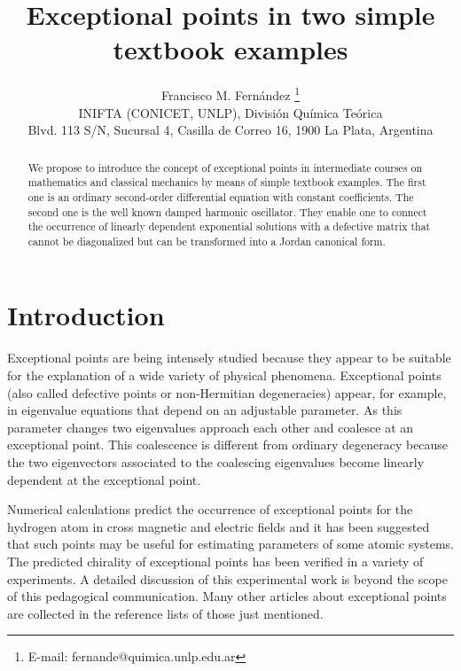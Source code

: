 \documentclass{article}
\begin{document}
\date{}
\title{Exceptional points in two simple textbook examples}
\author{Francisco M. Fern\'{a}ndez \thanks{%
E-mail: fernande@quimica.unlp.edu.ar} \\
INIFTA (CONICET, UNLP), Divisi\'on Qu\'imica Te\'orica\\
Blvd. 113 S/N, Sucursal 4, Casilla de Correo 16, 1900 La Plata, Argentina}
\maketitle

\begin{abstract}
We propose to introduce the concept of exceptional points in intermediate
courses on mathematics and classical mechanics by means of simple textbook
examples. The first one is an ordinary second-order differential equation
with constant coefficients. The second one is the well known damped harmonic
oscillator. They enable one to connect the occurrence of linearly dependent
exponential solutions with a defective matrix that cannot be diagonalized
but can be transformed into a Jordan canonical form.
\end{abstract}

\section{Introduction}

\label{sec:intro}

Exceptional points\cite{HS90,H00,HH01,H04,GRS07} are being intensely studied
because they appear to be suitable for the explanation of a wide variety of
physical phenomena. Exceptional points (also called defective points\cite
{MF80} or non-Hermitian degeneracies\cite{BO98}) appear, for example, in
eigenvalue equations that depend on an adjustable parameter. As this
parameter changes two eigenvalues approach each other and coalesce at an
exceptional point. This coalescence is different from ordinary degeneracy
because the two eigenvectors associated to the coalescing eigenvalues become
linearly dependent at the exceptional point.

Numerical calculations predict the occurrence of exceptional points for the
hydrogen atom in cross magnetic and electric fields\cite{CMW07} and it has
been suggested that such points may be useful for estimating parameters of
some atomic systems\cite{ASKM16}. The predicted chirality of exceptional
points has been verified in a variety of experiments\cite
{DGHHHRR01,DDGHHHR03,DMBKGLMRMR16,XMJH16}. A detailed discussion of this
experimental work is beyond the scope of this pedagogical communication.
Many other articles about exceptional points are collected in the reference
lists of those just mentioned.
\end{document}
